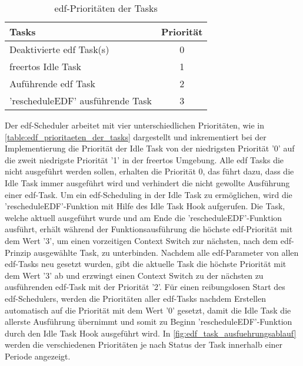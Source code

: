 \documentclass[../EDF Master Thesis.tex]{subfiles}
\begin{document}
    \begin{table}[ht!]
        \centering
        \begin{tabular}{l|c}
            Tasks & Priorität \\
            \hline
            Deaktivierte \ac{edf} Task(s) & 0\\
            \ac{freertos} Idle Task & 1\\
            Auführende \ac{edf} Task & 2\\
            'rescheduleEDF' ausführende Task & 3
        \end{tabular}
        \caption{\ac{edf}-Prioritäten der Tasks}
        \label{table:edf_prioritaeten_der_tasks}
    \end{table}

    Der \ac{edf}-Scheduler arbeitet mit vier unterschiedlichen Prioritäten, wie in \autoref{table:edf_prioritaeten_der_tasks} dargestellt und inkrementiert bei der Implementierung die Priorität der Idle Task von der niedrigsten Priorität '0' auf die zweit niedrigste Priorität '1' in der \ac{freertos} Umgebung.
    Alle \ac{edf} Tasks die nicht ausgeführt werden sollen, erhalten die Priorität 0, das führt dazu, dass die Idle Task immer ausgeführt wird und verhindert die nicht gewollte Ausführung einer \ac{edf}-Task.
    Um ein \ac{edf}-Scheduling in der Idle Task zu ermöglichen, wird die 'rescheduleEDF'-Funktion mit Hilfe des Idle Task Hook aufgerufen.
    Die Task, welche aktuell ausgeführt wurde und am Ende die 'rescheduleEDF'-Funktion ausführt, erhält während der Funktionsausführung die höchste \ac{edf}-Priorität mit dem Wert '3', um einen vorzeitigen Context Switch zur nächsten, nach dem \ac{edf}-Prinzip ausgewählte Task, zu unterbinden.
    Nachdem alle \ac{edf}-Parameter von allen \ac{edf}-Tasks neu gesetzt wurden, gibt die aktuelle Task die höchste Priorität mit dem Wert '3' ab und erzwingt einen Context Switch zu der nächsten zu ausführenden \ac{edf}-Task mit der Priorität '2'.
    Für einen reibungslosen Start des \ac{edf}-Schedulers, werden die Prioritäten aller \ac{edf}-Tasks nachdem Erstellen automatisch auf die Priorität mit dem Wert '0' gesetzt, damit die Idle Task die allerste Ausführung übernimmt und somit zu Beginn 'rescheduleEDF'-Funktion durch den Idle Task Hook ausgeführt wird.
    In \autoref{fig:edf_task_ausfuehrungsablauf} werden die verschiedenen Prioritäten je nach Status der Task innerhalb einer Periode angezeigt.
    
\end{document}
